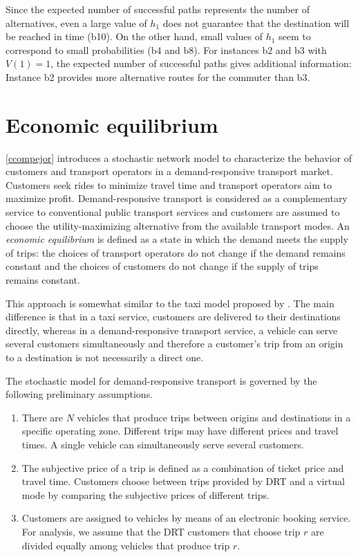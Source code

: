 \documentclass[dissertation,draft*]{aaltoseries}
\begin{document}
Since the expected number of successful paths represents the number of alternatives,
even a large value of $h_1$ does not guarantee that the destination will be reached in time (b10).
On the other hand, small values of $h_1$ seem to correspond to small probabilities (b4 and b8).
For instances b2 and b3 with $V(1)=1$, the expected number of successful paths gives additional
information: Instance b2 provides more alternative routes for the commuter than b3.   


\chapter{Economic equilibrium}
\label{economicmodels}
\ref{ccompejor} introduces a stochastic network model to characterize the 
behavior of customers and transport operators in a demand-responsive transport market. 
Customers seek rides to minimize travel time and transport operators aim to maximize profit. 
Demand-responsive transport is considered as a complementary service to conventional public transport services and 
customers are assumed to choose the utility-maximizing alternative from the available transport modes.
An \emph{economic equilibrium} is defined as a state in which the demand meets the supply of trips: 
the choices of transport operators
do not change if the demand remains constant and the choices of customers
do not change if the supply of trips remains constant. 

This approach is somewhat similar to the taxi model proposed by \cite{yang2010}. The main difference is that in a taxi service, 
customers are delivered to their destinations directly, whereas in a demand-responsive transport service, a vehicle can serve several customers 
simultaneously and therefore a customer's trip from an origin to a destination is not necessarily a direct one. 

The stochastic model for demand-responsive transport is governed by the following preliminary assumptions.
\begin{enumerate}
\item
There are $N$ vehicles that produce trips between 
origins and destinations in a specific operating zone. 
Different trips may have different prices and
travel times. A single vehicle can simultaneously serve several customers.
\item
The subjective price of a trip is defined as a combination of ticket price and travel time.
Customers choose between trips provided by 
DRT and a virtual mode by comparing the subjective 
prices of different trips.
\item
Customers are assigned to vehicles by means of an electronic booking service.
For analysis, we assume that the DRT customers that 
choose trip $r$ are divided equally among vehicles that produce trip $r$. 
\end{enumerate} 
\end{document}
